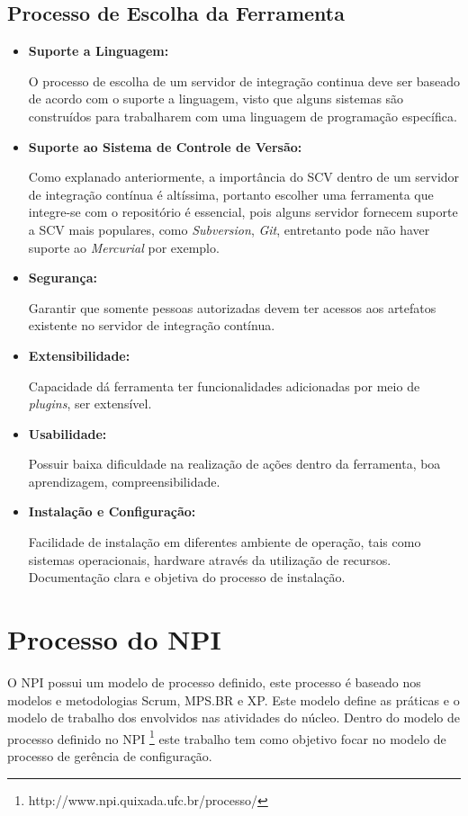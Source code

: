 \subsection{Processo de Escolha da Ferramenta}\label{escolhaFerramenta}
\begin{itemize}
\item {\textbf{Suporte a Linguagem:}}

O processo de escolha de um servidor de integração continua deve ser baseado de acordo com o suporte a linguagem, visto que alguns sistemas são construídos para trabalharem com uma linguagem de programação específica.

\item {\textbf{Suporte ao Sistema de Controle de Versão:}}

Como explanado anteriormente, a importância do SCV dentro de um servidor de integração contínua é altíssima, portanto escolher uma ferramenta que integre-se com o repositório é essencial, pois alguns servidor fornecem suporte a SCV mais populares, como \textit{Subversion}, \textit{Git}, entretanto pode não haver suporte ao \textit{Mercurial} por exemplo.


\item {\textbf{Segurança:}}

Garantir que somente pessoas autorizadas devem ter acessos aos artefatos existente no servidor de integração contínua.

\item {\textbf{Extensibilidade:}}

Capacidade dá ferramenta ter funcionalidades adicionadas por meio de \textit{plugins}, ser extensível.

\item {\textbf{Usabilidade:}}

Possuir baixa dificuldade na realização de ações dentro da ferramenta, boa aprendizagem, compreensibilidade.

\item {\textbf{Instalação e Configuração:}}

Facilidade de instalação em diferentes ambiente de operação, tais como sistemas operacionais, hardware através da utilização de recursos. Documentação clara e objetiva do processo de instalação.


\end{itemize}

\section{Processo do NPI}\label{processonpi}
O NPI possui um modelo de processo definido, este processo é baseado nos modelos e metodologias Scrum, MPS.BR e XP. Este modelo define as práticas e o modelo de trabalho dos envolvidos nas atividades do núcleo. Dentro do modelo de processo definido no NPI \footnote{http://www.npi.quixada.ufc.br/processo/} este trabalho tem como objetivo focar no modelo de processo de gerência de configuração.


